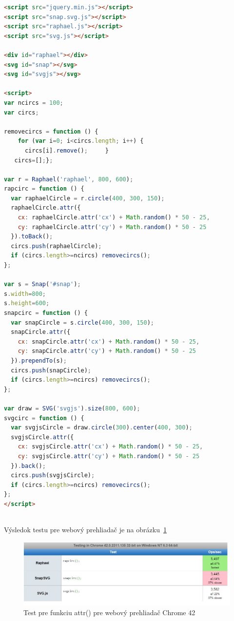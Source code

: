 \begin{lstlisting}[language = html]
<script src="jquery.min.js"></script>
<script src="snap.svg.js"></script>
<script src="raphael.js"></script>
<script src="svg.js"></script>

<div id="raphael"></div>
<svg id="snap"></svg>
<svg id="svgjs"></svg>

<script>
var ncircs = 100;
var circs;

removecircs = function () {
    for (var i=0; i<circs.length; i++) {
      circs[i].remove();     }
   circs=[];};

var r = Raphael('raphael', 800, 600);
rapcirc = function () {
  var raphaelCircle = r.circle(400, 300, 150);
  raphaelCircle.attr({
    cx: raphaelCircle.attr('cx') + Math.random() * 50 - 25,
    cy: raphaelCircle.attr('cy') + Math.random() * 50 - 25
  }).toBack();
  circs.push(raphaelCircle);
  if (circs.length>=ncircs) removecircs();
};

var s = Snap('#snap');
s.width=800;
s.height=600;
snapcirc = function () {
  var snapCircle = s.circle(400, 300, 150);
  snapCircle.attr({
    cx: snapCircle.attr('cx') + Math.random() * 50 - 25,
    cy: snapCircle.attr('cy') + Math.random() * 50 - 25
  }).prependTo(s);
  circs.push(snapCircle);
  if (circs.length>=ncircs) removecircs();
};

var draw = SVG('svgjs').size(800, 600);
svgcirc = function () {
  var svgjsCircle = draw.circle(300).center(400, 300);
  svgjsCircle.attr({
    cx: svgjsCircle.attr('cx') + Math.random() * 50 - 25,
    cy: svgjsCircle.attr('cy') + Math.random() * 50 - 25
  }).back();
  circs.push(svgjsCircle);
  if (circs.length>=ncircs) removecircs();
};
</script>
 
\end{lstlisting}

Výsledok testu pre webový prehliadač je na obrázku~\ref{fig:graf2}

 \begin{figure}[H]
\centering
\includegraphics[width=0.7\linewidth]{obrazky/test2.JPG}
\caption{Test pre funkciu attr() pre webový prehliadač Chrome 42}
\label{fig:graf2}
\end{figure}





